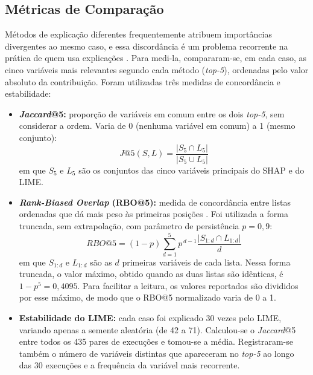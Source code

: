 \subsection{Métricas de Comparação}

Métodos de explicação diferentes frequentemente atribuem importâncias divergentes ao mesmo caso, e essa discordância é um problema recorrente na prática de quem usa explicações \cite{krishnaDisagreementProblemExplainable2024}. Para medi-la, compararam-se, em cada caso, as cinco variáveis mais relevantes segundo cada método (\textit{top-5}), ordenadas pelo valor absoluto da contribuição. Foram utilizadas três medidas de concordância e estabilidade:

\begin{itemize}
    \item \textbf{\textit{Jaccard}@5:} proporção de variáveis em comum entre os dois \textit{top-5}, sem considerar a ordem. Varia de 0 (nenhuma variável em comum) a 1 (mesmo conjunto):
    \begin{equation}
        J@5(S, L) = \frac{|S_5 \cap L_5|}{|S_5 \cup L_5|}
    \end{equation}
    em que $S_5$ e $L_5$ são os conjuntos das cinco variáveis principais do SHAP e do LIME.
    \item \textbf{\textit{Rank-Biased Overlap} (RBO@5):} medida de concordância entre listas ordenadas que dá mais peso às primeiras posições \cite{webberSimilarityMeasureIndefinite2010}. Foi utilizada a forma truncada, sem extrapolação, com parâmetro de persistência $p = 0{,}9$:
    \begin{equation}
        RBO@5 = (1 - p) \sum_{d=1}^{5} p^{\,d-1} \frac{|S_{1:d} \cap L_{1:d}|}{d}
    \end{equation}
    em que $S_{1:d}$ e $L_{1:d}$ são as $d$ primeiras variáveis de cada lista. Nessa forma truncada, o valor máximo, obtido quando as duas listas são idênticas, é $1 - p^5 = 0{,}4095$. Para facilitar a leitura, os valores reportados são divididos por esse máximo, de modo que o RBO@5 normalizado varia de 0 a 1.
    \item \textbf{Estabilidade do LIME:} cada caso foi explicado 30 vezes pelo LIME, variando apenas a semente aleatória (de 42 a 71). Calculou-se o \textit{Jaccard}@5 entre todos os 435 pares de execuções e tomou-se a média. Registraram-se também o número de variáveis distintas que apareceram no \textit{top-5} ao longo das 30 execuções e a frequência da variável mais recorrente.
\end{itemize}

